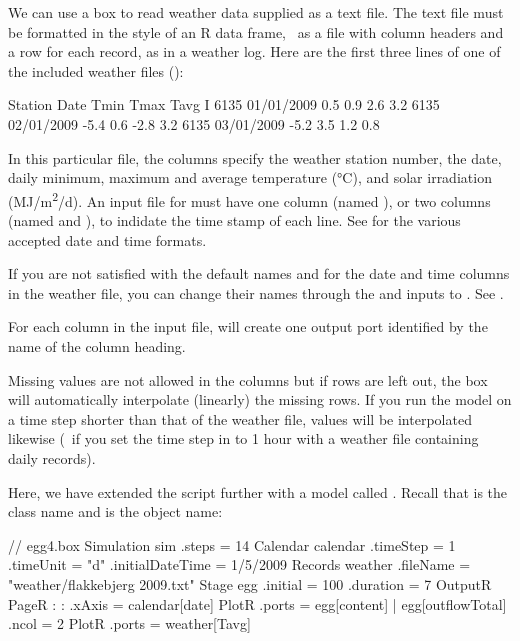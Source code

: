 We can use a  box to read weather data supplied as a text file. The text file must be formatted in the style of an R data frame, \ie\ as a file with column headers and a row for each record, as in a weather log. Here are the first three lines of one of the included weather files ():

\lstset{tabsize=8}
\begin{boxscript}
Station  Date    Tmin  Tmax  Tavg  I
6135  01/01/2009  0.5  0.9  2.6  3.2
6135  02/01/2009  -5.4  0.6  -2.8  3.2
6135  03/01/2009  -5.2  3.5  1.2  0.8
\end{boxscript}
\lstset{tabsize=2}

In this particular file, the columns specify the weather station number, the date, daily minimum, maximum and average temperature (\si{\degreeCelsius}), and solar irradiation (\si{MJ/m^2/d}). An input file for  must have one column (named ), or two columns (named  and ), to indidate the time stamp of each line. See  for the various accepted date and time formats. 

If you are not satisfied with the default names  and  for the date and time columns in the weather file, you can change their names through the  and  inputs to . See .

For each column in the input file,  will create one output port identified by the name of the column heading.

Missing values are not allowed in the columns but if rows are left out, the  box will automatically interpolate (linearly) the missing rows. If you run the model on a time step shorter than that of the weather file, values will be interpolated likewise (\eg\ if you set the time step in  to 1 hour with a weather file containing daily records).

Here, we have extended the  script further with a  model called . Recall that  is the class name and  is the object name:

\lstset{numbers=left}
\begin{boxscript}
// egg4.box
Simulation sim {
  .steps = 14
  Calendar calendar {
    .timeStep = 1
    .timeUnit = "d"
    .initialDateTime = 1/5/2009
  }
  Records weather {
    .fileName = "weather/flakkebjerg 2009.txt"
  }
  Stage egg {
    .initial = 100 
    .duration = 7
  }
  OutputR {
    PageR {
:
:
    .xAxis = calendar[date]
      PlotR {
        .ports = egg[content] | egg[outflowTotal]
        .ncol = 2
      }
      PlotR {
        .ports = weather[Tavg]   
      }
    }
  }
}
\end{boxscript}
\lstset{numbers=none}

